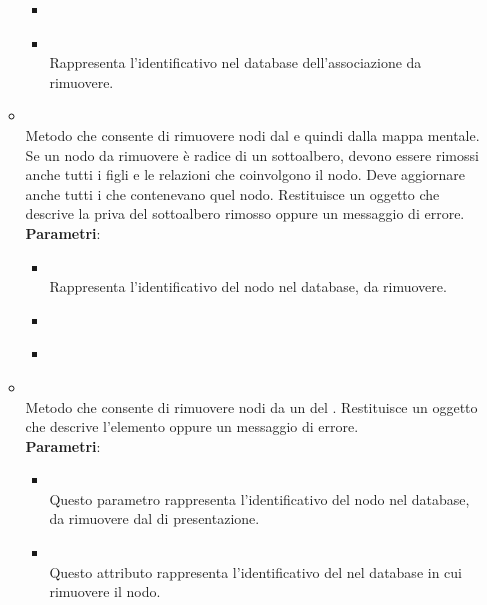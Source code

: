 \begin{itemize}
\begin{itemize}
\begin{itemize}
\item {}
\\ \dpErrBack
\item {}
\\ Rappresenta l'identificativo nel database dell'associazione da rimuovere.
\end{itemize}
\item {}
\\ Metodo che consente di rimuovere nodi dal  e quindi dalla mappa mentale. Se un nodo da rimuovere è radice di un sottoalbero, devono essere rimossi anche tutti i figli e le relazioni che coinvolgono il nodo. Deve aggiornare anche tutti i  che contenevano quel nodo. Restituisce un oggetto  che descrive la  priva del sottoalbero rimosso oppure un messaggio di errore.
\\ \textbf{Parametri}:
\begin{itemize}
\item {}
\\ Rappresenta l’identificativo del nodo nel database, da rimuovere.
\item {}
\\ \dpCallback
\item {}
\\ \dpErrBack
\end{itemize}
\item {}
\\ Metodo che consente di rimuovere nodi da un  del . Restituisce un oggetto  che descrive l’elemento oppure un messaggio di errore.
\\ \textbf{Parametri}:
\begin{itemize}
\item {}
\\ Questo parametro rappresenta l'identificativo del nodo nel database, da rimuovere dal  di presentazione.
\item {}
\\ Questo attributo rappresenta l'identificativo del  nel database in cui rimuovere il nodo.

\end{itemize}
\end{itemize}
\end{itemize}

